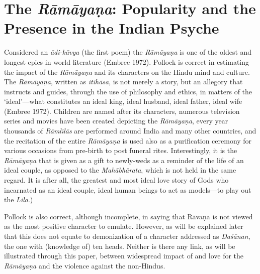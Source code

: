 \section*{The \textit{Rāmāyaṇa}: Popularity and the Presence in the Indian Psyche}

Considered an \textit{ādi-kāvya} (the first poem) the \textit{Rāmāyaṇa} is one of the oldest and longest epics in world literature (Embree 1972). Pollock is correct in estimating the impact of the \textit{Rāmāyaṇa} and its characters on the Hindu mind and culture. The \textit{Rāmāyaṇa}, written as \textit{itihāsa}, is not merely a story, but an allegory that instructs and guides, through the use of philosophy and ethics, in matters of the ‘ideal’—what constitutes an ideal king, ideal husband, ideal father, ideal wife (Embree 1972). Children are named after its characters, numerous television series and movies have been created depicting the \textit{Rāmāyaṇa}, every year thousands of \textit{Rāmlīlās} are performed around India and many other countries, and the recitation of the entire \textit{Rāmāyaṇa} is used also as a purification ceremony for various occasions from pre-birth to post funeral rites. Interestingly, it is the \textit{Rāmāyaṇa} that is given as a gift to newly-weds as a reminder of the life of an ideal couple, as opposed to the \textit{Mahābhārata}, which is not held in the same regard. It is after all, the greatest and most ideal love story of Gods who incarnated as an ideal couple, ideal human beings to act as models—to play out the \textit{Lila}.)

Pollock is also correct, although incomplete, in saying that Rāvaṇa is not viewed as the most positive character to emulate. However, as will be explained later that this does not equate to demonization of a character addressed as \textit{Daśānan}, the one with (knowledge of) ten heads. Neither is there any link, as will be illustrated through this paper, between widespread impact of and love for the \textit{Rāmāyaṇa} and the violence against the non-Hindus.

